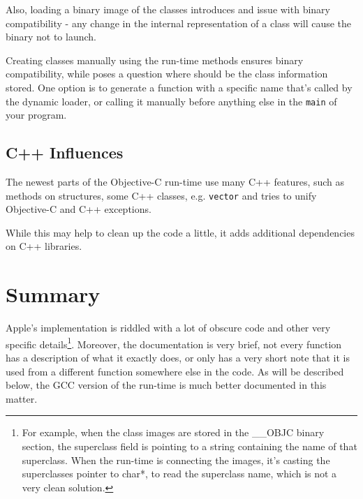 Also, loading a binary image of the classes introduces and issue with binary compatibility - any change in the internal representation of a class will cause the binary not to launch.

Creating classes manually using the run-time methods ensures binary compatibility, while poses a question where should be the class information stored. One option is to generate a function with a specific name that's called by the dynamic loader, or calling it manually before anything else in the \verb=main= of your program.

\subsection{C++ Influences}
The newest parts of the Objective-C run-time use many C++ features, such as methods on structures, some C++ classes, e.g. \verb=vector= and tries to unify Objective-C and C++ exceptions.

While this may help to clean up the code a little, it adds additional dependencies on C++ libraries.


\section{Summary}
Apple's implementation is riddled with a lot of obscure code and other very specific details\footnote{For example, when the class images are stored in the \_\_OBJC binary section, the superclass field is pointing to a string containing the name of that superclass. When the run-time is connecting the images, it's casting the superclasses pointer to char*, to read the superclass name, which is not a very clean solution.}. Moreover, the documentation is very brief, not every function has a description of what it exactly does, or only has a very short note that it is used from a different function somewhere else in the code. As will be described below, the GCC version of the run-time is much better documented in this matter.